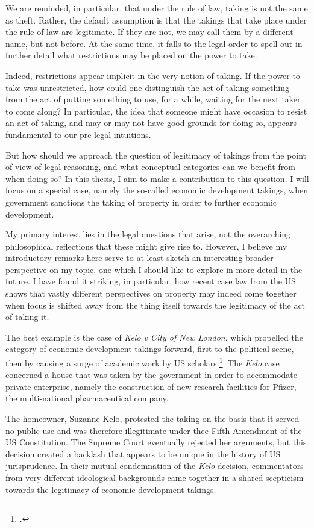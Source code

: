 \documentclass{article} %
\begin{document}
We are reminded, in particular, that under the rule of law, taking is not the same as theft. Rather, the default assumption is that the takings that take place under the rule of law are legitimate. If they are not, we may call them by a different name, but not before. At the same time, it falls to the legal order to spell out in further detail what restrictions may be placed on the power to take. 

Indeed, restrictions appear implicit in the very notion of taking. If the power to take was unrestricted, how could one distinguish the act of taking something from the act of putting something to use, for a while, waiting for the next taker to come along? In particular, the idea that someone might have occasion to resist an act of taking, and may or may not have good grounds for doing so, appears fundamental to our pre-legal intuitions.

But how should we approach the question of legitimacy of takings from the point of view of legal reasoning, and what conceptual categories can we benefit from when doing so? In this thesis, I aim to make a contribution to this question. I will focus on a special case, namely the so-called economic development takings, when government sanctions the taking of property in order to further economic development.

My primary interest lies in the legal questions that arise, not the overarching philosophical reflections that these might give rise to. However, I believe my introductory remarks here serve to at least sketch an interesting broader perspective on my topic, one which I should like to explore in more detail in the future. I have found it striking, in particular, how recent case law from the US shows that vastly different perspectives on property may indeed come together when focus is shifted away from the thing itself towards the legitimacy of the act of taking it.

The best example is the case of {\it Kelo v City of New London}, which propelled the category of economic development takings forward, first to the political scene, then by causing a surge of academic work by US scholars.\footcite{kelo05}. The {\it Kelo} case concerned a house that was taken by the government in order to accommodate private enterprise, namely the construction of new research facilities for Pfizer, the multi-national pharmaceutical company.

The homeowner, Suzanne Kelo, protested the taking on the basis that it served no public use and was therefore illegitimate under thee Fifth Amendment of the US Constitution. The Supreme Court eventually rejected her arguments, but this decision created a backlash that appears to be unique in the history of US jurisprudence. In their mutual condemnation of the {\it Kelo} decision, commentators from very different ideological backgrounds came together in a shared scepticism towards the legitimacy of economic development takings.
\end{document}
